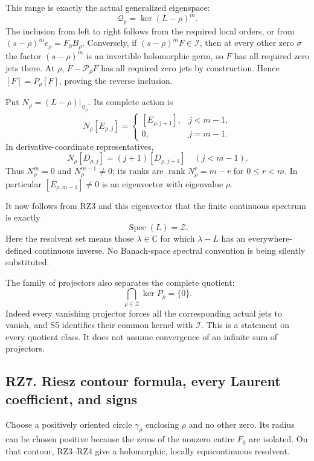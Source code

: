 \documentclass[
]{article}
\begin{document}
This range is exactly the actual generalized eigenspace: \[
\mathcal Q_\rho=\ker(L-\rho)^m.
\tag{RZ6.6}
\] The inclusion from left to right follows from the required local
orders, or from \((s-\rho)^m e_\rho=F_0B_\rho\). Conversely, if
\((s-\rho)^mF\in\mathcal I\), then at every other zero \(\sigma\) the
factor \((s-\rho)^m\) is an invertible holomorphic germ, so \(F\) has
all required zero jets there. At \(\rho\), \(F-\mathscr P_\rho F\) has
all required zero jets by construction. Hence \([F]=P_\rho[F]\), proving
the reverse inclusion.

Put \(N_\rho=(L-\rho)|_{\mathcal Q_\rho}\). Its complete action is \[
N_\rho[E_{\rho,j}]=
\begin{cases}
[E_{\rho,j+1}],&j<m-1,\\
0,&j=m-1.
\end{cases}
\tag{RZ6.7}
\] In derivative-coordinate representatives, \[
N_\rho[D_{\rho,j}]=(j+1)[D_{\rho,j+1}]
\quad(j<m-1).
\tag{RZ6.8}
\] Thus \(N_\rho^m=0\) and \(N_\rho^{m-1}\ne0\); its ranks are
\(\operatorname{rank}N_\rho^r=m-r\) for \(0\leq r<m\). In particular
\([E_{\rho,m-1}]\ne0\) is an eigenvector with eigenvalue \(\rho\).

It now follows from RZ3 and this eigenvector that the finite continuous
spectrum is exactly \[
\boxed{\operatorname{Spec}(L)=\mathscr Z.}
\tag{RZ6.9}
\] Here the resolvent set means those \(\lambda\in\mathbb C\) for which
\(\lambda-L\) has an everywhere-defined continuous inverse. No
Banach-space spectral convention is being silently substituted.

The family of projectors also separates the complete quotient: \[
\bigcap_{\rho\in\mathscr Z}\ker P_\rho=\{0\}.
\tag{RZ6.10}
\] Indeed every vanishing projector forces all the corresponding actual
jets to vanish, and S5 identifies their common kernel with
\(\mathcal I\). This is a statement on every quotient class. It does not
assume convergence of an infinite sum of projectors.

\subsection{RZ7. Riesz contour formula, every Laurent coefficient, and
signs}\label{rz7.-riesz-contour-formula-every-laurent-coefficient-and-signs}

Choose a positively oriented circle \(\gamma_\rho\) enclosing \(\rho\)
and no other zero. Its radius can be chosen positive because the zeros
of the nonzero entire \(F_0\) are isolated. On that contour, RZ3--RZ4
give a holomorphic, locally equicontinuous resolvent.
\end{document}

